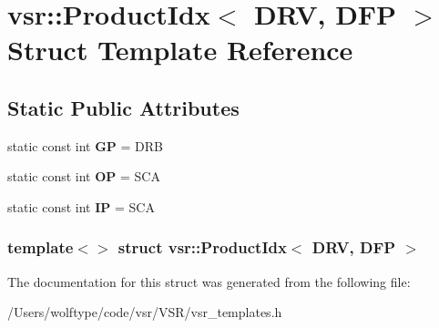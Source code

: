 \hypertarget{structvsr_1_1_product_idx_3_01_d_r_v_00_01_d_f_p_01_4}{\section{vsr\-:\-:Product\-Idx$<$ D\-R\-V, D\-F\-P $>$ Struct Template Reference}
\label{structvsr_1_1_product_idx_3_01_d_r_v_00_01_d_f_p_01_4}
}
\subsection*{Static Public Attributes}
\begin{DoxyCompactItemize}
\item 
\hypertarget{structvsr_1_1_product_idx_3_01_d_r_v_00_01_d_f_p_01_4_a5c4744c6636e4e03c470311ad3b38e43}{static const int {\bfseries G\-P} = D\-R\-B}\label{structvsr_1_1_product_idx_3_01_d_r_v_00_01_d_f_p_01_4_a5c4744c6636e4e03c470311ad3b38e43}

\item 
\hypertarget{structvsr_1_1_product_idx_3_01_d_r_v_00_01_d_f_p_01_4_aa6be0c6dc7133dd794f1900bbd1ca80e}{static const int {\bfseries O\-P} = S\-C\-A}\label{structvsr_1_1_product_idx_3_01_d_r_v_00_01_d_f_p_01_4_aa6be0c6dc7133dd794f1900bbd1ca80e}

\item 
\hypertarget{structvsr_1_1_product_idx_3_01_d_r_v_00_01_d_f_p_01_4_a14f7758b17c102c0574ba620c1413619}{static const int {\bfseries I\-P} = S\-C\-A}\label{structvsr_1_1_product_idx_3_01_d_r_v_00_01_d_f_p_01_4_a14f7758b17c102c0574ba620c1413619}

\end{DoxyCompactItemize}
\subsubsection*{template$<$$>$ struct vsr\-::\-Product\-Idx$<$ D\-R\-V, D\-F\-P $>$}



The documentation for this struct was generated from the following file\-:\begin{DoxyCompactItemize}
\item 
/\-Users/wolftype/code/vsr/\-V\-S\-R/vsr\-\_\-templates.\-h\end{DoxyCompactItemize}

